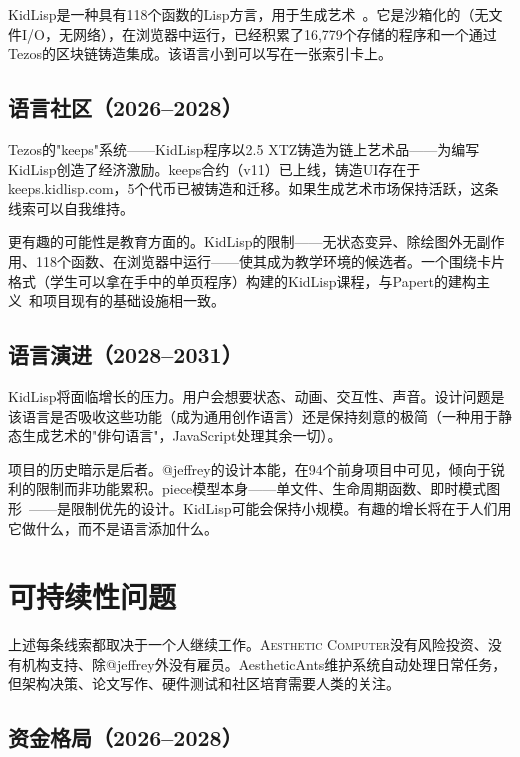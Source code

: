 \documentclass[10pt,letterpaper,twocolumn]{article}
\newcommand{\ac}{\textsc{Aesthetic Computer}}
\begin{document}
KidLisp是一种具有118个函数的Lisp方言，用于生成艺术~\citep{scudder2026kidlisp}。它是沙箱化的（无文件I/O，无网络），在浏览器中运行，已经积累了16,779个存储的程序和一个通过Tezos的区块链铸造集成。该语言小到可以写在一张索引卡上。

\subsection{语言社区（2026--2028）}

Tezos的"keeps"系统——KidLisp程序以2.5 XTZ铸造为链上艺术品——为编写KidLisp创造了经济激励。keeps合约（v11）已上线，铸造UI存在于keeps.kidlisp.com，5个代币已被铸造和迁移。如果生成艺术市场保持活跃，这条线索可以自我维持。

更有趣的可能性是教育方面的。KidLisp的限制——无状态变异、除绘图外无副作用、118个函数、在浏览器中运行——使其成为教学环境的候选者。一个围绕卡片格式（学生可以拿在手中的单页程序）构建的KidLisp课程，与Papert的建构主义~\citep{papert1980mindstorms}和项目现有的基础设施相一致。

\subsection{语言演进（2028--2031）}

KidLisp将面临增长的压力。用户会想要状态、动画、交互性、声音。设计问题是该语言是否吸收这些功能（成为通用创作语言）还是保持刻意的极简（一种用于静态生成艺术的"俳句语言"，JavaScript处理其余一切）。

项目的历史暗示是后者。@jeffrey的设计本能，在94个前身项目中可见，倾向于锐利的限制而非功能累积。piece模型本身——单文件、生命周期函数、即时模式图形~\citep{scudder2026pieces}——是限制优先的设计。KidLisp可能会保持小规模。有趣的增长将在于人们用它做什么，而不是语言添加什么。


\section{可持续性问题}
\label{sec:sustainability}

上述每条线索都取决于一个人继续工作。\ac{}没有风险投资、没有机构支持、除@jeffrey外没有雇员。AestheticAnts维护系统自动处理日常任务，但架构决策、论文写作、硬件测试和社区培育需要人类的关注。

\subsection{资金格局（2026--2028）}
\end{document}

